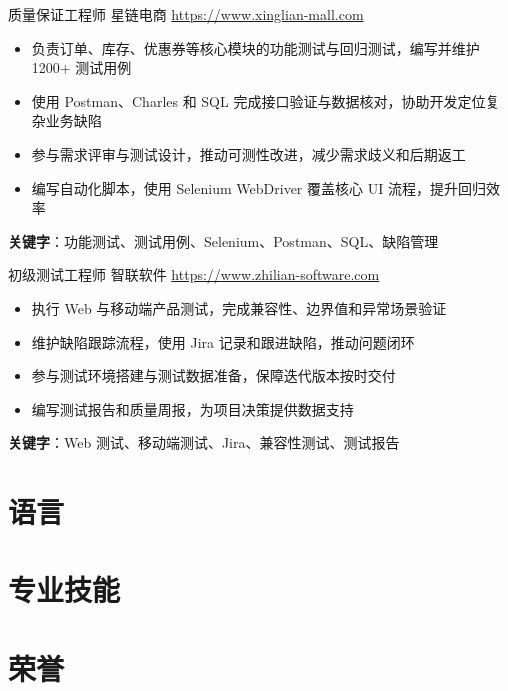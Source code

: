 \documentclass[a4paper, serif, 10pt]{moderncv}
\begin{document}
        {质量保证工程师}
        {星链电商}
        {\url{https://www.xinglian-mall.com}}
        {}
        {\begin{itemize}
\item 负责订单、库存、优惠券等核心模块的功能测试与回归测试，编写并维护 1200+ 测试用例
\item 使用 Postman、Charles 和 SQL 完成接口验证与数据核对，协助开发定位复杂业务缺陷
\item 参与需求评审与测试设计，推动可测性改进，减少需求歧义和后期返工
\item 编写自动化脚本，使用 Selenium WebDriver 覆盖核心 UI 流程，提升回归效率
\end{itemize}
\textbf{关键字}：功能测试、测试用例、Selenium、Postman、SQL、缺陷管理}

        {初级测试工程师}
        {智联软件}
        {\url{https://www.zhilian-software.com}}
        {}
        {\begin{itemize}
\item 执行 Web 与移动端产品测试，完成兼容性、边界值和异常场景验证
\item 维护缺陷跟踪流程，使用 Jira 记录和跟进缺陷，推动问题闭环
\item 参与测试环境搭建与测试数据准备，保障迭代版本按时交付
\item 编写测试报告和质量周报，为项目决策提供数据支持
\end{itemize}
\textbf{关键字}：Web 测试、移动端测试、Jira、兼容性测试、测试报告}
\section{语言}

\section{专业技能}

\section{荣誉}
\end{document}
